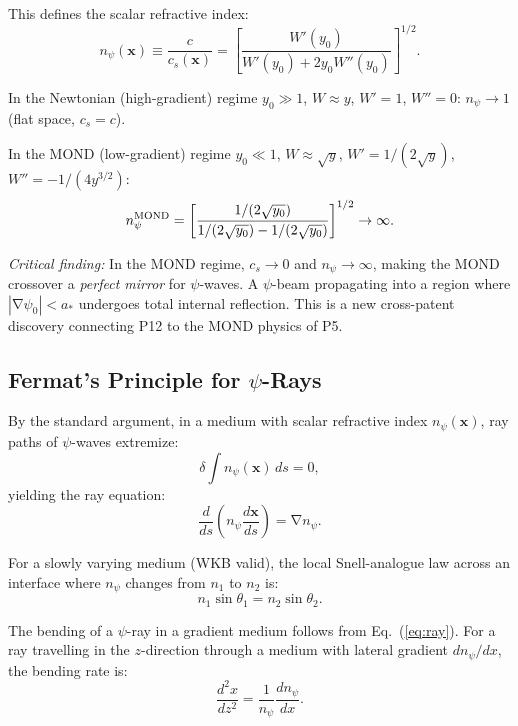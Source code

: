\documentclass[aps,prd,twocolumn,superscriptaddress]{revtex4-2}
\newcommand{\npsi}{n_\psi}
\DeclareMathOperator{\grad}{\nabla}
\begin{document}
This defines the scalar refractive index:
\begin{equation}
\boxed{
\npsi(\mathbf{x}) \equiv \frac{c}{c_s(\mathbf{x})}
= \left[\frac{W'(y_0)}{W'(y_0) + 2y_0 W''(y_0)}\right]^{1/2}.
}
\label{eq:npsi}
\end{equation}

In the Newtonian (high-gradient) regime $y_0 \gg 1$, $W \approx y$,
$W' = 1$, $W'' = 0$: $\npsi \to 1$ (flat space, $c_s = c$).

In the MOND (low-gradient) regime $y_0 \ll 1$, $W \approx \sqrt{y}$,
$W' = 1/(2\sqrt{y})$, $W'' = -1/(4y^{3/2})$:
\begin{equation}
\npsi^{\rm MOND} = \left[\frac{1/(2\sqrt{y_0})}{1/(2\sqrt{y_0})
- 1/(2\sqrt{y_0})}\right]^{1/2} \to \infty.
\label{eq:npsi-mond}
\end{equation}

\textit{Critical finding:} In the MOND regime, $c_s \to 0$ and
$\npsi \to \infty$, making the MOND crossover a \emph{perfect mirror}
for $\psi$-waves.  A $\psi$-beam propagating into a region where
$|\grad\psi_0| < a_*$ undergoes total internal reflection.  This is
a new cross-patent discovery connecting P12 to the MOND physics of P5.

\subsection{Fermat's Principle for $\psi$-Rays}

By the standard argument, in a medium with scalar refractive index
$\npsi(\mathbf{x})$, ray paths of $\psi$-waves extremize:
\begin{equation}
\delta \int \npsi(\mathbf{x})\,ds = 0,
\label{eq:fermat}
\end{equation}
yielding the ray equation:
\begin{equation}
\frac{d}{ds}\left(\npsi\frac{d\mathbf{x}}{ds}\right) = \grad\npsi.
\label{eq:ray}
\end{equation}

For a slowly varying medium (WKB valid), the local Snell-analogue law
across an interface where $\npsi$ changes from $n_1$ to $n_2$ is:
\begin{equation}
n_1\sin\theta_1 = n_2\sin\theta_2.
\label{eq:snell}
\end{equation}

The bending of a $\psi$-ray in a gradient medium follows from
Eq.~(\ref{eq:ray}).  For a ray travelling in the $z$-direction through
a medium with lateral gradient $d\npsi/dx$, the bending rate is:
\begin{equation}
\frac{d^2 x}{dz^2} = \frac{1}{\npsi}\frac{d\npsi}{dx}.
\label{eq:bending}
\end{equation}
\end{document}
